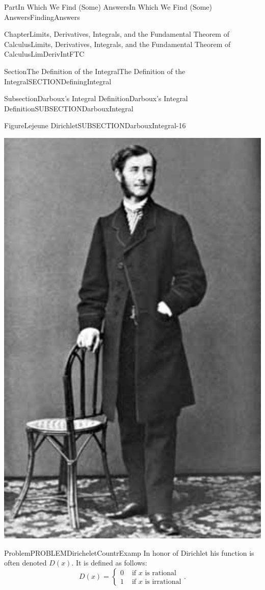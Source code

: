 \documentclass[oneside,10pt,]{book}
\numberwithin{equation}{part}
\newcommand{\amp}{&}
\begin{document}
\begin{partptx}{Part}{In Which We Find (Some) Answers}{}{In Which We Find (Some) Answers}{}{}{FindingAnswers}
\begin{chapterptx}{Chapter}{Limits, Derivatives, Integrals, and the Fundamental Theorem of Calculus}{}{Limits, Derivatives, Integrals, and the Fundamental Theorem of Calculus}{}{}{LimDerivIntFTC}
\begin{sectionptx}{Section}{The Definition of the Integral}{}{The Definition of the Integral}{}{}{SECTIONDefiningIntegral}
\begin{subsectionptx}{Subsection}{Darboux's Integral Definition}{}{Darboux's Integral Definition}{}{}{SUBSECTIONDarbouxIntegral}
\begin{figureptx}{Figure}{Lejeune Dirichlet}{SUBSECTIONDarbouxIntegral-16}{}
\begin{image}{0.325}{0.35}{0.325}{}
\includegraphics[width=\linewidth]{external/images/Dirichlet.png}
\end{image}%
\tcblower
\end{figureptx}%
\begin{problem}{Problem}{}{PROBLEMDiricheletCountrExamp}%
In honor of Dirichlet his function is often denoted \(D(x)\). It is defined as follows:%
\begin{equation*}
D(x)=
\begin{cases}
0\amp \text{ if } x \text{ is rational}\\
1\amp \text{ if } x \text{ is irrational}
\end{cases}\text{.}
\end{equation*}
%
\par

\end{problem}
\end{subsectionptx}
\end{sectionptx}
\end{chapterptx}
\end{partptx}
\end{document}
